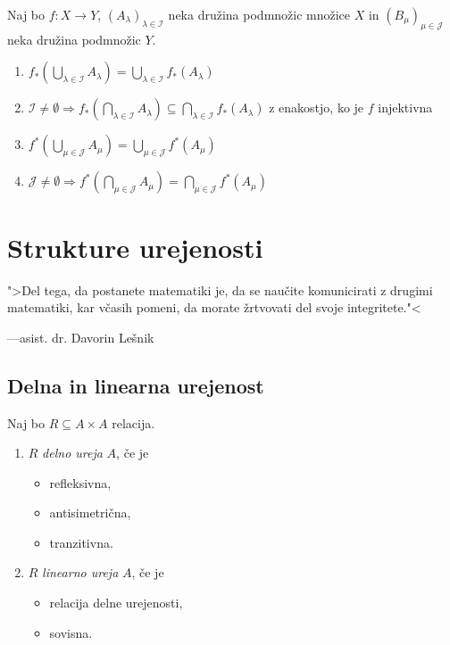 \documentclass[12pt, a4paper]{article}
\renewcommand{\implies}{\Rightarrow}
\begin{document}
\begin{trditev}
Naj bo $f\colon X\to Y$, $(A_{\lambda})_{\lambda\in\mathcal{I}}$ neka družina podmnožic množice $X$ in $(B_{\mu})_{\mu\in\mathcal{J}}$ neka družina podmnožic $Y$.

\begin{enumerate}
\item $f_*\left(\bigcup_{\lambda\in\mathcal{I}} A_{\lambda}\right)=\bigcup_{\lambda\in\mathcal{I}} f_*(A_{\lambda})$
\item $\mathcal{I}\ne\emptyset\implies f_*\left(\bigcap_{\lambda\in\mathcal{I}} A_{\lambda}\right)\subseteq\bigcap_{\lambda\in\mathcal{I}} f_*(A_{\lambda})$ z enakostjo, ko je $f$ injektivna
\item $f^*\left(\bigcup_{\mu\in\mathcal{J}} A_{\mu}\right)=\bigcup_{\mu\in\mathcal{J}} f^*(A_{\mu})$
\item $\mathcal{J}\ne\emptyset\implies f^*\left(\bigcap_{\mu\in\mathcal{J}} A_{\mu}\right)=\bigcap_{\mu\in\mathcal{J}} f^*(A_{\mu})$
\end{enumerate}
\end{trditev}

\newpage

\section{Strukture urejenosti}

\epigraph{">Del tega, da postanete matematiki je, da se naučite komunicirati z drugimi matematiki, kar včasih pomeni, da morate žrtvovati del svoje integritete."<}{---asist. dr. Davorin Lešnik}

\subsection{Delna in linearna urejenost}

\begin{okvir}
\begin{definicija}
Naj bo $R\subseteq A\times A$ relacija.

\begin{enumerate}
\item $R$ \emph{delno ureja} $A$, če je

\begin{itemize}
\item refleksivna,
\item antisimetrična,
\item tranzitivna.
\end{itemize}

\item $R$ \emph{linearno ureja} $A$, če je

\begin{itemize}
\item relacija delne urejenosti,
\item sovisna.
\end{itemize}
\end{enumerate}
\end{definicija}
\end{okvir}
\end{document}

